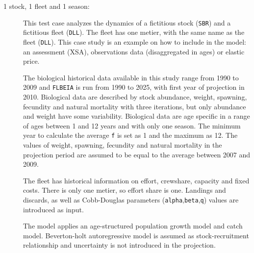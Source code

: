 \begin{description}
  \item[1 stock, 1 fleet and 1 season:] This test case analyzes the dynamics of a fictitious stock (\texttt{SBR}) and a fictitious fleet (\texttt{DLL}). The fleet has one metier, with the same name as the fleet (\texttt{DLL}). This case study is an example on how to include in the model: an assessment (XSA), observations data (disaggregated in ages) or elastic price. 

The biological historical data available in this study range from 1990 to 2009 and \texttt{FLBEIA} is run from 1990 to 2025, with first year of projection in 2010. Biological data are described by stock abundance, weight, spawning, fecundity and natural mortality with three iterations, but only abundance and weight have some variability. Biological data are age specific in a range of ages between 1 and 12 years and with only one season.  The minimum year to calculate the average \texttt{f} is set as 1 and the maximum as 12. The values of weight, spawning, fecundity and natural mortality in the projection period are assumed to be equal to the average between 2007 and 2009.

The fleet has historical information on effort, crewshare, capacity and fixed costs. There is only one metier, so effort share is one. Landings and discards, as well as Cobb-Douglas parameters (\texttt{alpha},\texttt{beta},\texttt{q}) values are introduced as input.

The model applies an age-structured population growth model and catch model. Beverton-holt autoregressive model is assumed as stock-recruitment relationship and uncertainty is not introduced in the projection. 
\end{description}

